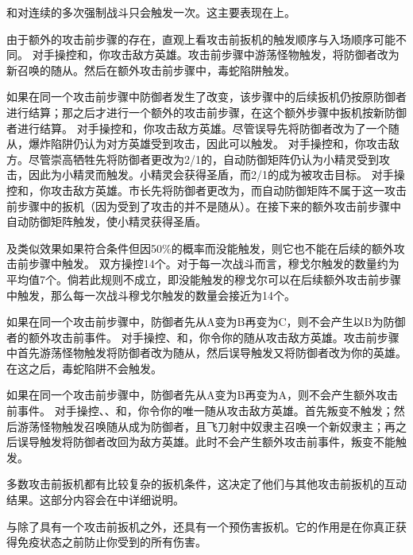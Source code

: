 \exception {}和对连续的多次强制战斗只会触发一次。这主要表现在上。

由于额外的攻击前步骤的存在，直观上看攻击前扳机的触发顺序与入场顺序可能不同。
\example 对手操控和，你攻击敌方英雄。攻击前步骤中游荡怪物触发，将防御者改为新召唤的随从。然后在额外攻击前步骤中，毒蛇陷阱触发。

如果在同一个攻击前步骤中防御者发生了改变，该步骤中的后续扳机仍按原防御者进行结算；那之后才进行一个额外的攻击前步骤，在这个额外步骤中扳机按新防御者进行结算。
\example 对手操控和，你攻击敌方英雄。尽管误导先将防御者改为了一个随从，爆炸陷阱仍认为对方英雄受到攻击，因此可以触发。
\example 对手操控和，你攻击敌方。尽管崇高牺牲先将防御者更改为2/1的，自动防御矩阵仍认为小精灵受到攻击，因此为小精灵而触发。小精灵会获得圣盾，而2/1的成为被攻击目标。
\example 对手操控和，你攻击敌方英雄。市长先将防御者更改为，而自动防御矩阵不属于这一攻击前步骤中的扳机（因为受到了攻击的并不是随从）。在接下来的额外攻击前步骤中自动防御矩阵触发，使小精灵获得圣盾。

及类似效果如果符合条件但因50\%的概率而没能触发，则它也不能在后续的额外攻击前步骤中触发。
\example 双方操控14个。对于每一次战斗而言，穆戈尔触发的数量约为平均值7个。倘若此规则不成立，即没能触发的穆戈尔可以在后续额外攻击前步骤中触发，那么每一次战斗穆戈尔触发的数量会接近为14个。

如果在同一个攻击前步骤中，防御者先从A变为B再变为C，则不会产生以B为防御者的额外攻击前事件。
\example 对手操控、和，你令你的随从攻击敌方英雄。攻击前步骤中首先游荡怪物触发将防御者改为随从，然后误导触发又将防御者改为你的英雄。在这之后，毒蛇陷阱不会触发。

如果在同一个攻击前步骤中，防御者先从A变为B再变为A，则不会产生额外攻击前事件。
\example 对手操控、、和，你令你的唯一随从攻击敌方英雄。首先叛变不触发；然后游荡怪物触发召唤随从成为防御者，且飞刀射中奴隶主召唤一个新奴隶主；再之后误导触发将防御者改回为敌方英雄。此时不会产生额外攻击前事件，叛变不能触发。

多数攻击前扳机都有比较复杂的扳机条件，这决定了他们与其他攻击前扳机的互动结果。这部分内容会在中详细说明。

与除了具有一个攻击前扳机之外，还具有一个预伤害扳机。它的作用是在你真正获得免疫状态之前防止你受到的所有伤害。

